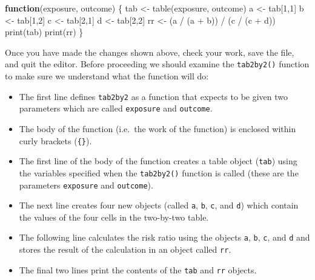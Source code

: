 \documentclass[
  12pt,
]{book}
\newenvironment{Shaded}{\begin{snugshade}}{\end{snugshade}}
\newcommand{\ControlFlowTok}[1]{\textcolor[rgb]{0.13,0.29,0.53}{\textbf{#1}}}
\newcommand{\DecValTok}[1]{\textcolor[rgb]{0.00,0.00,0.81}{#1}}
\newcommand{\FunctionTok}[1]{\textcolor[rgb]{0.00,0.00,0.00}{#1}}
\newcommand{\NormalTok}[1]{#1}
\newcommand{\OtherTok}[1]{\textcolor[rgb]{0.56,0.35,0.01}{#1}}
\newcommand{\SpecialCharTok}[1]{\textcolor[rgb]{0.00,0.00,0.00}{#1}}
\begin{document}
\newpage

\begin{Shaded}
\begin{Highlighting}[]
\ControlFlowTok{function}\NormalTok{(exposure, outcome)}
\NormalTok{  \{}
\NormalTok{  tab }\OtherTok{\textless{}{-}} \FunctionTok{table}\NormalTok{(exposure, outcome)}
\NormalTok{  a }\OtherTok{\textless{}{-}}\NormalTok{ tab[}\DecValTok{1}\NormalTok{,}\DecValTok{1}\NormalTok{]}
\NormalTok{  b }\OtherTok{\textless{}{-}}\NormalTok{ tab[}\DecValTok{1}\NormalTok{,}\DecValTok{2}\NormalTok{]}
\NormalTok{  c }\OtherTok{\textless{}{-}}\NormalTok{ tab[}\DecValTok{2}\NormalTok{,}\DecValTok{1}\NormalTok{]}
\NormalTok{  d }\OtherTok{\textless{}{-}}\NormalTok{ tab[}\DecValTok{2}\NormalTok{,}\DecValTok{2}\NormalTok{]}
\NormalTok{  rr }\OtherTok{\textless{}{-}}\NormalTok{ (a }\SpecialCharTok{/}\NormalTok{ (a }\SpecialCharTok{+}\NormalTok{ b)) }\SpecialCharTok{/}\NormalTok{ (c }\SpecialCharTok{/}\NormalTok{ (c }\SpecialCharTok{+}\NormalTok{ d))}
  \FunctionTok{print}\NormalTok{(tab)}
  \FunctionTok{print}\NormalTok{(rr) }
\NormalTok{  \}}
\end{Highlighting}
\end{Shaded}

Once you have made the changes shown above, check your work, save the file, and quit the editor.
Before proceeding we should examine the \texttt{tab2by2()} function to make sure we understand what the function will do:

\begin{itemize}
\item
  The first line defines \texttt{tab2by2} as a function that expects to be given two parameters which are called \texttt{exposure} and \texttt{outcome}.
\item
  The body of the function (i.e.~the work of the function) is enclosed within curly brackets (\texttt{\{\}}).
\item
  The first line of the body of the function creates a table object (\texttt{tab}) using the variables specified when the \texttt{tab2by2()} function is called (these are the parameters \texttt{exposure} and \texttt{outcome}).
\item
  The next line creates four new objects (called \texttt{a}, \texttt{b}, \texttt{c}, and \texttt{d}) which contain the values of the four cells in the two-by-two table.
\item
  The following line calculates the risk ratio using the objects \texttt{a}, \texttt{b}, \texttt{c}, and \texttt{d} and stores the result of the calculation in an object called \texttt{rr}.
\item
  The final two lines print the contents of the \texttt{tab} and \texttt{rr} objects.
\end{itemize}
\end{document}

